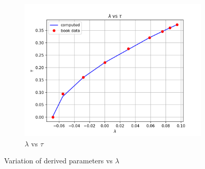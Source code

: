 \begin{figure}[!h]
\begin{subfigure}{1.00\linewidth}
       \centering
        \includegraphics[scale=0.5]{supporting_documents/02_question_2_and_3_codeDevelopment/03_postProcessing/lambda_vs_Tau.png}
        \caption{$\lambda$ vs $\tau$}
    \end{subfigure}
    \caption{Variation of derived parameters vs $\lambda$}
    \label{FS_numerical_plot}
\end{figure}
